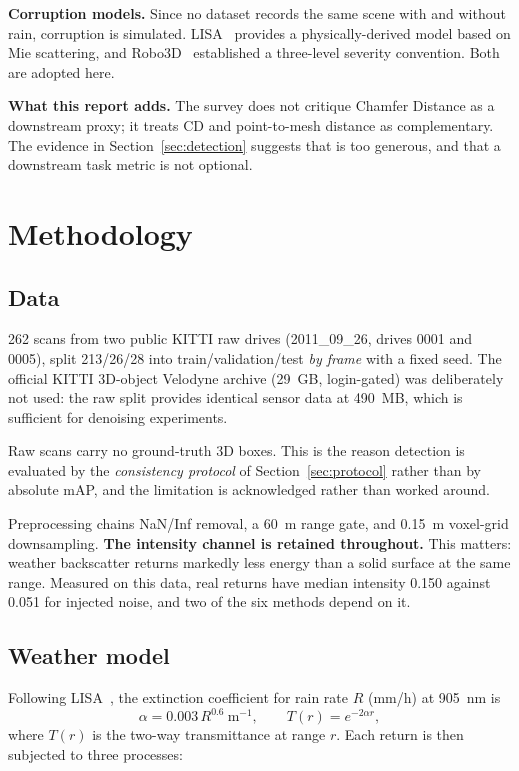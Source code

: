 \documentclass[11pt,a4paper]{article}
\begin{document}
\textbf{Corruption models.} Since no dataset records the same scene with and
without rain, corruption is simulated. LISA~\cite{lisa} provides a
physically-derived model based on Mie scattering, and Robo3D~\cite{robo3d}
established a three-level severity convention. Both are adopted here.

\textbf{What this report adds.} The survey does not critique Chamfer Distance
as a downstream proxy; it treats CD and point-to-mesh distance as
complementary. The evidence in Section~\ref{sec:detection} suggests that is
too generous, and that a downstream task metric is not optional.

\section{Methodology}

\subsection{Data}

262 scans from two public KITTI raw drives (2011\_09\_26, drives 0001 and
0005), split 213/26/28 into train/validation/test \emph{by frame} with a
fixed seed. The official KITTI 3D-object Velodyne archive (29~GB,
login-gated) was deliberately not used: the raw split provides identical
sensor data at 490~MB, which is sufficient for denoising experiments.

Raw scans carry no ground-truth 3D boxes. This is the reason detection is
evaluated by the \emph{consistency protocol} of Section~\ref{sec:protocol}
rather than by absolute mAP, and the limitation is acknowledged rather than
worked around.

Preprocessing chains NaN/Inf removal, a 60~m range gate, and 0.15~m
voxel-grid downsampling. \textbf{The intensity channel is retained
throughout.} This matters: weather backscatter returns markedly less energy
than a solid surface at the same range. Measured on this data, real
returns have median intensity 0.150 against 0.051 for injected noise, and
two of the six methods depend on it.

\subsection{Weather model}

Following LISA~\cite{lisa}, the extinction coefficient for rain rate $R$
(mm/h) at 905~nm is
\[
\alpha = 0.003\,R^{0.6}\ \mathrm{m^{-1}},
\qquad
T(r) = e^{-2\alpha r},
\]
where $T(r)$ is the two-way transmittance at range $r$. Each return is then
subjected to three processes:
\end{document}

